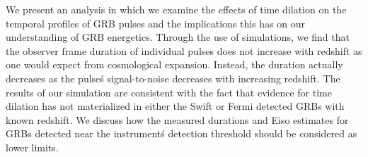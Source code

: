 


\bigskip



\bigskip

\noindent We present an analysis in which we examine the effects of time dilation on the temporal profiles of GRB pulses and the implications this has on our understanding of GRB energetics.  Through the use of simulations, we find that the observer frame duration of individual pulses does not increase with redshift as one would expect from cosmological expansion. Instead, the duration actually decreases as the pulse\'s signal-to-noise decreases with increasing redshift.  The results of our simulation are consistent with the fact that evidence for time dilation has not materialized in either the Swift or Fermi detected GRBs with known redshift.  We discuss how the measured durations and Eiso estimates for GRBs detected near the instrument\'s detection threshold should be considered as lower limits.

